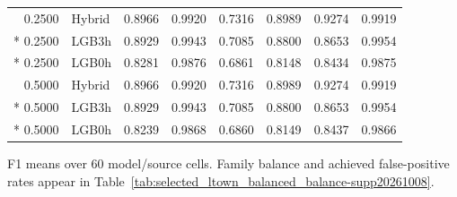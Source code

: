 \begin{longtable}{@{}rlrrrrrr@{}}
0.2500 & Hybrid & 0.8966 & 0.9920 & 0.7316 & 0.8989 & 0.9274 & 0.9919 \\*
0.2500 & LGB3h & 0.8929 & 0.9943 & 0.7085 & 0.8800 & 0.8653 & 0.9954 \\*
0.2500 & LGB0h & 0.8281 & 0.9876 & 0.6861 & 0.8148 & 0.8434 & 0.9875 \\
0.5000 & Hybrid & 0.8966 & 0.9920 & 0.7316 & 0.8989 & 0.9274 & 0.9919 \\*
0.5000 & LGB3h & 0.8929 & 0.9943 & 0.7085 & 0.8800 & 0.8653 & 0.9954 \\*
0.5000 & LGB0h & 0.8239 & 0.9868 & 0.6860 & 0.8149 & 0.8437 & 0.9866 \\
\end{longtable}
\noindent\footnotesize F1 means over 60 model/source cells. Family balance and achieved false-positive rates appear in Table~\ref{tab:selected_ltown_balanced_balance-supp20261008}.
\par\endgroup
